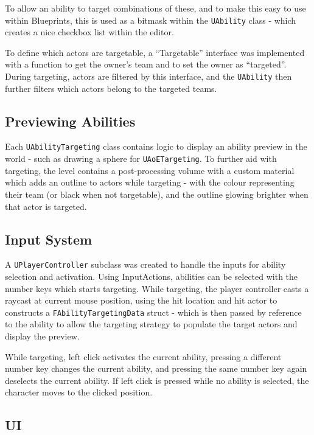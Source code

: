 \documentclass{article}
\begin{document}
To allow an ability to target combinations of these, and to make this easy to use within Blueprints, this is used as a bitmask within the \texttt{UAbility} class - which creates a nice checkbox list within the editor.

To define which actors are targetable, a “Targetable” interface was implemented with a function to get the owner’s team and to set the owner as “targeted”. During targeting, actors are filtered by this interface, and the \texttt{UAbility} then further filters which actors belong to the targeted teams.

\subsection{Previewing Abilities}

Each \texttt{UAbilityTargeting} class contains logic to display an ability preview in the world - such as drawing a sphere for \texttt{UAoETargeting}. To further aid with targeting, the level contains a post-processing volume with a custom material which adds an outline to actors while targeting - with the colour representing their team (or black when not targetable), and the outline glowing brighter when that actor is targeted.

\subsection{Input System}

A \texttt{UPlayerController} subclass was created to handle the inputs for ability selection and activation. Using InputActions, abilities can be selected with the number keys which starts targeting. While targeting, the player controller casts a raycast at current mouse position, using the hit location and hit actor to constructs a \texttt{FAbilityTargetingData} struct - which is then passed by reference to the ability to allow the targeting strategy to populate the target actors and display the preview.

While targeting, left click activates the current ability, pressing a different number key changes the current ability, and pressing the same number key again deselects the current ability. If left click is pressed while no ability is selected, the character moves to the clicked position.

\subsection{UI}
\end{document}
